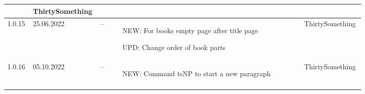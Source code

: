 \begin{tiny}
\begin{longtable}{ | p{0.06\linewidth} | p{0.08\linewidth} | p{0.06\linewidth} | P{0.49\linewidth} | p{0.15\linewidth} | }
\begin{tsLTItemize}
        \end{tsLTItemize}
                                 &
        ThirtySomething            \\
        \hline
        1.0.15                   &
        25.06.2022               &
        --                       &
        \begin{tsLTItemize}
            \item NEW: For books empty page after title page
            \item UPD: Change order of book parts
        \end{tsLTItemize}
                                 &
        ThirtySomething            \\
        \hline
        1.0.16                   &
        05.10.2022               &
        --                       &
        \begin{tsLTItemize}
            \item NEW: Command tsNP to start a new paragraph
        \end{tsLTItemize}
                                 &
        ThirtySomething            \\
        \hline
    \end{longtable}
\end{tiny}
